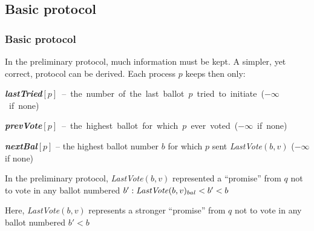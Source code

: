 \documentclass[10 pt]{beamer}
\begin{document}
\subsection{Basic protocol}


\begin{frame}
\frametitle{Basic protocol}

In the preliminary protocol, much information must be kept. A simpler, yet correct, protocol can be derived. Each process $p$ keeps then only:

\vspace{2 mm}
\mbox{\textit{\textbf{lastTried}}$[p]$ -- the number of the last ballot $p$ tried to initiate ($-\infty$ if none)}

\vspace{2mm}
\mbox{\textit{\textbf{prevVote}}$[p]$ -- the highest ballot for which $p$ ever voted ($-\infty$ if none)}

\vspace{2mm}
\textit{\textbf{nextBal}}$[p]$ -- the highest ballot number $b$ for which $p$ sent \textit{LastVote}$(b, v)$ ($-\infty$ if none)

\vspace{4mm}
In the preliminary protocol, \textit{LastVote}$(b, v)$ represented a ``promise'' from $q$ not to vote in any ballot numbered $b' : \text{\textit{LastVote}}(b, v)_{bal} < b' < b$ 

\vspace{2mm}
Here, \textit{LastVote}$(b, v)$ represents a stronger ``promise'' from $q$ not to vote in any ballot numbered $b' < b$

\end{frame} 
\end{document}
